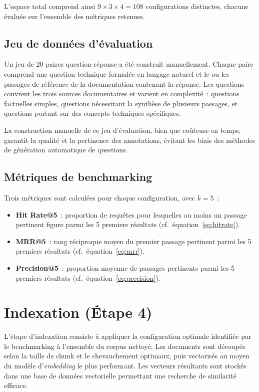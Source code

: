 \documentclass[12pt,a4paper,oneside]{report}
\begin{document}
L'espace total comprend ainsi $9 \times 3 \times 4 = 108$ configurations distinctes, chacune évaluée sur l'ensemble des métriques retenues.

\subsection{Jeu de données d'évaluation}

Un jeu de 20 paires question-réponse a été construit manuellement. Chaque paire comprend une question technique formulée en langage naturel et le ou les passages de référence de la documentation contenant la réponse. Les questions couvrent les trois sources documentaires et varient en complexité~: questions factuelles simples, questions nécessitant la synthèse de plusieurs passages, et questions portant sur des concepts techniques spécifiques.

La construction manuelle de ce jeu d'évaluation, bien que coûteuse en temps, garantit la qualité et la pertinence des annotations, évitant les biais des méthodes de génération automatique de questions.

\subsection{Métriques de benchmarking}

Trois métriques sont calculées pour chaque configuration, avec $k = 5$~:
\begin{itemize}[nosep]
  \item \textbf{Hit Rate@5}~: proportion de requêtes pour lesquelles au moins un passage pertinent figure parmi les 5 premiers résultats (cf.\ équation~\ref{eq:hitrate}).
  \item \textbf{MRR@5}~: rang réciproque moyen du premier passage pertinent parmi les 5 premiers résultats (cf.\ équation~\ref{eq:mrr}).
  \item \textbf{Precision@5}~: proportion moyenne de passages pertinents parmi les 5 premiers résultats (cf.\ équation~\ref{eq:precision}).
\end{itemize}

\section{Indexation (Étape 4)}
\label{sec:indexation}

L'étape d'indexation consiste à appliquer la configuration optimale identifiée par le benchmarking à l'ensemble du corpus nettoyé. Les documents sont découpés selon la taille de chunk et le chevauchement optimaux, puis vectorisés au moyen du modèle d'\textit{embedding} le plus performant. Les vecteurs résultants sont stockés dans une base de données vectorielle permettant une recherche de similarité efficace.
\end{document}
